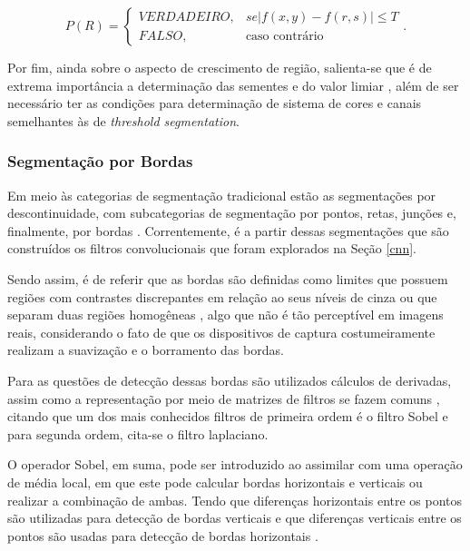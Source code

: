 \begin{equation}
\label{segment:eq:3}
P(R) = \left\{\begin{matrix}
    VERDADEIRO, & se |f(x,y) - f(r,s)| \leq T \\
    FALSO,      &  \text{caso contrário}
\end{matrix}\right..
\end{equation}

Por fim, ainda sobre o aspecto de crescimento de região, salienta-se que é de extrema importância a determinação das sementes e do valor limiar \cite{Yuheng2017, pedrini2008analise}, além de ser necessário ter as condições para determinação de sistema de cores e canais semelhantes às de \textit{threshold segmentation}.


\subsubsection{Segmentação por Bordas}
\label{segment:limit}

Em meio às categorias de segmentação tradicional estão as segmentações por descontinuidade, com subcategorias de segmentação por pontos, retas, junções e, finalmente, por bordas \cite{pedrini2008analise}. Correntemente, é a partir dessas segmentações que são construídos os filtros convolucionais que foram explorados na Seção \ref{cnn}.

Sendo assim, é de referir que as bordas são definidas como limites que possuem regiões com contrastes discrepantes em relação ao seus níveis de cinza  ou que separam duas regiões homogêneas \cite{pedrini2008analise,Yuheng2017}, algo que não é tão perceptível em imagens reais, considerando o fato de que os dispositivos de captura costumeiramente realizam a suavização e o borramento das bordas.

Para as questões de detecção dessas bordas são utilizados cálculos de derivadas, assim  como a representação por meio de matrizes de filtros se fazem comuns \cite{pedrini2008analise, muthukrishnan2011edge}, citando que um dos mais conhecidos filtros de primeira ordem é o filtro Sobel e para segunda ordem, cita-se o filtro laplaciano.

O operador Sobel, em suma, pode ser introduzido ao assimilar com uma operação de média local, em que este pode calcular bordas horizontais e verticais ou realizar a combinação de ambas. Tendo que diferenças horizontais entre os pontos são utilizadas para detecção de bordas verticais e que diferenças verticais entre os pontos são usadas para detecção de bordas horizontais \cite{pedrini2008analise}.

